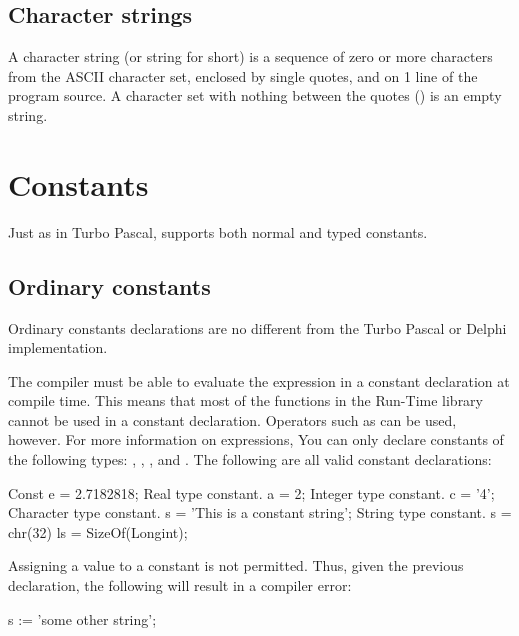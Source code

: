 \documentclass{report}
\begin{document}
\section{Character strings}
A character string (or string for short) is a sequence of zero or more
characters from the ASCII character set, enclosed by single quotes, and on 1
line of the program source.
A character set with nothing between the quotes () is an empty 
string.

\chapter{Constants}
Just as in Turbo Pascal, \fpc supports both normal and typed constants.
\section{Ordinary constants}
Ordinary constants declarations are no different from the Turbo Pascal or
Delphi  implementation.

The compiler must be able to evaluate the expression in a constant
declaration at compile time.  This means that most of the functions
in the Run-Time library cannot be used in a constant declaration.
Operators such as  can be used, however. For more information on expressions,
You can only declare constants of the following types: ,
, , and . 
The following are all valid constant declarations:
\begin{listing}
Const
  e = 2.7182818;  { Real type constant. }
  a = 2;          { Integer type constant. }
  c = '4';        { Character type constant. }
  s = 'This is a constant string'; {String type constant.}
  s = chr(32)
  ls = SizeOf(Longint);
\end{listing}
Assigning a value to a constant is not permitted. Thus, given the previous
declaration, the following will result in a compiler error:
\begin{listing}
  s := 'some other string';
\end{listing}
\end{document}
